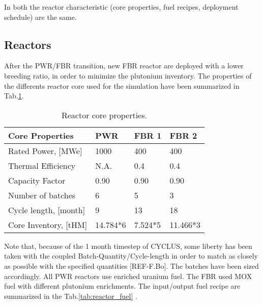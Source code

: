 \documentclass[12pt]{article}
\begin{document}
In both the reactor characteristic (core properties, fuel recipes, deployment schedule) are the same. 
\subsection{Reactors}
After the PWR/FBR transition, new FBR reactor are deployed with a lower breeding ratio, in order to minimize the plutonium inventory. The properties of the differents reactor core used for the simulation have been summarized in Tab.\ref{tab:reactor}.\\


\begin{table}[h!]
\centering
\begin{tabular}{llll}
\hline
Core Properties		&	PWR 	&	FBR 1	&	FBR 2 	\\ 
\hline 
Rated Power, [MWe]	&	1000		&	400		&	400		\\ 
Thermal Efficiency	&	N.A.		&	0.4		&	0.4		\\ 
Capacity Factor		&	0.90		&	0.90		&	0.90		\\ 
Number of batches	&	6		&	5		&	3		\\ 
Cycle length, [month]&	9		&	13		&	18		\\ 
Core Inventory, [tHM]&	14.784*6	&	7.524*5	&	11.466*3	\\ 
\hline
\end{tabular}
\caption{Reactor core properties.}
\label{tab:reactor}
\end{table}
Note that, because of the 1 month timestep of CYCLUS, some liberty has been taken with the coupled Batch-Quantity/Cycle-length in order to match as closely as possible with the specified quantities [REF-F.Bo]. The batches have been sized accordingly. All PWR reactors use enriched uranium fuel. The FBR used MOX fuel with different plutonium enrichments. The input/output fuel recipe are summarized in the Tab.\ref{tab:reactor_fuel} \cite{B.Feng_calculation}.
\end{document}
